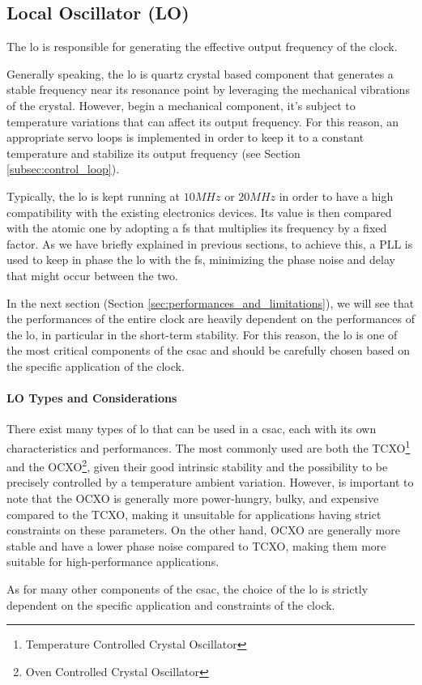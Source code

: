 \subsection{Local Oscillator (LO)}
\label{subsec:local_oscillator}

The \acrfull{lo} is responsible for generating the effective output frequency of the clock.

Generally speaking, the \acrshort{lo} is quartz crystal based component that generates a stable frequency near its resonance point by leveraging the mechanical vibrations of the crystal.
However, begin a mechanical component, it's subject to temperature variations that can affect its output frequency.
For this reason, an appropriate servo loops is implemented in order to keep it to a constant temperature and stabilize its output frequency (see Section \ref{subsec:control_loop}).

Typically, the \acrshort{lo} is kept running at $10MHz$ or $20MHz$ in order to have a high compatibility with the existing electronics devices.
Its value is then compared with the atomic one by adopting a \acrfull{fs} that multiplies its frequency by a fixed factor.
As we have briefly explained in previous sections, to achieve this, a PLL is used to keep in phase the \acrshort{lo} with the \acrshort{fs}, minimizing the phase noise and delay that might occur between the two.

In the next section (Section \ref{sec:performances_and_limitations}), we will see that the performances of the entire clock are heavily dependent on the performances of the \acrshort{lo}, in particular in the short-term stability.
For this reason, the \acrshort{lo} is one of the most critical components of the \acrshort{csac} and should be carefully chosen based on the specific application of the clock.


\paragraph{LO Types and Considerations}

There exist many types of \acrshort{lo} that can be used in a \acrshort{csac}, each with its own characteristics and performances.
The most commonly used are both the TCXO\footnote{Temperature Controlled Crystal Oscillator} and the OCXO\footnote{Oven Controlled Crystal Oscillator}, given their good intrinsic stability and the possibility to be precisely controlled by a temperature ambient variation.
However, is important to note that the OCXO is generally more power-hungry, bulky, and expensive compared to the TCXO, making it unsuitable for applications having strict constraints on these parameters.
On the other hand, OCXO are generally more stable and have a lower phase noise compared to TCXO, making them more suitable for high-performance applications.

As for many other components of the \acrshort{csac}, the choice of the \acrshort{lo} is strictly dependent on the specific application and constraints of the clock.
